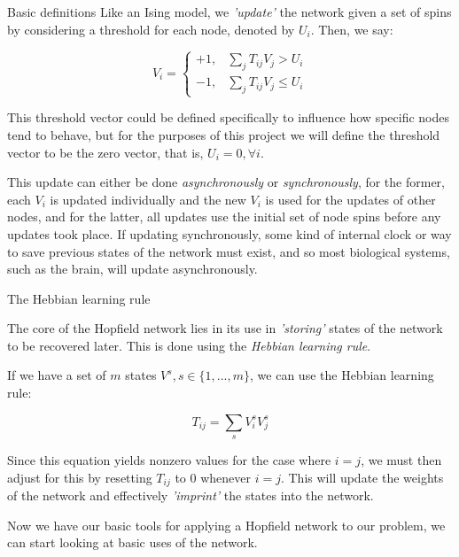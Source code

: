 \documentclass[final]{beamer}
\newlength{\colwidth}
\begin{document}
\begin{frame}[t]
\begin{columns}[t]
\begin{column}{\colwidth}
\begin{block}{Basic definitions}
    Like an Ising model, we \textit{'update'} the network given a set of spins by
    considering a threshold for each node, denoted by $U_i$. Then, we say:

    \begin{equation} \label{update_rule}
      V_i = \begin{cases} 
              +1, & \sum_{j}T_{ij}V_j > U_i \\
              -1, & \sum_{j}T_{ij}V_j \leq U_i
            \end{cases}
    \end{equation}

    This threshold vector could be defined specifically to influence how specific nodes
    tend to behave, but for the purposes of this project we will define the threshold
    vector to be the zero vector, that is, $U_i = 0, \forall i$.

    This update can either be done \textit{asynchronously} or \textit{synchronously}, for the former,
    each $V_i$ is updated individually and the new $V_i$ is used for the updates
    of other nodes, and for the latter, all updates use the initial set of node spins
    before any updates took place. If updating synchronously, some kind of internal
    clock or way to save previous states of the network must exist, and so most 
    biological systems, such as the brain, will update asynchronously.
  \end{block}

  \begin{alertblock}{The Hebbian learning rule}

    The core of the Hopfield network lies in its use in \textit{'storing'} states
    of the network to be recovered later. This is done using the \textit{Hebbian learning
    rule}. \cite{hopfield:1982}

    If we have a set of $m$ states $V^s, s \in \{1, ..., m\}$, we can use the
    Hebbian learning rule:

    \begin{equation} \label{hebbian_learning_rule}
      T_{ij} = \sum_{s}{V^s_i}{V^s_j}
    \end{equation}

    Since this equation yields nonzero values for the case where $i = j$, we must
    then adjust for this by resetting $T_{ij}$ to $0$ whenever $i = j$. This will 
    update the weights of the network and effectively \textit{'imprint'}
    the states into the network.

    Now we have our basic tools for applying a Hopfield network to our problem, we
    can start looking at basic uses of the network.
  \end{alertblock}


\end{column}
\end{columns}
\end{frame}
\end{document}
